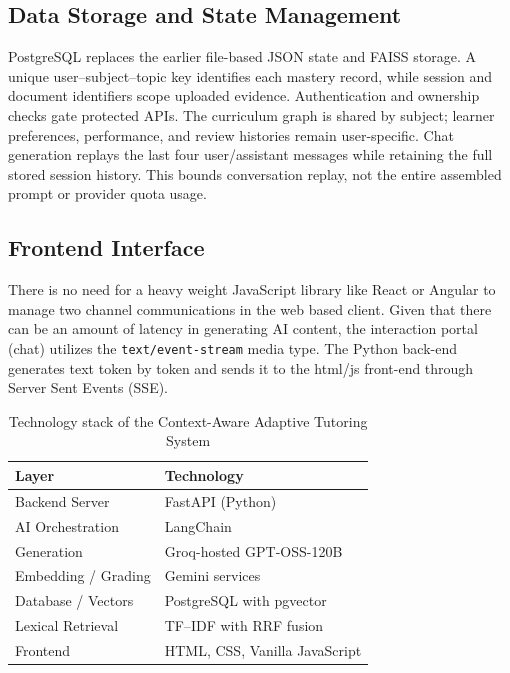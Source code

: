 \documentclass[11pt, a4paper, oneside]{report}
\begin{document}
\subsection{Data Storage and State Management}
PostgreSQL replaces the earlier file-based JSON state and FAISS storage. A unique user--subject--topic key identifies each mastery record, while session and document identifiers scope uploaded evidence. Authentication and ownership checks gate protected APIs. The curriculum graph is shared by subject; learner preferences, performance, and review histories remain user-specific. Chat generation replays the last four user/assistant messages while retaining the full stored session history. This bounds conversation replay, not the entire assembled prompt or provider quota usage.

\subsection{Frontend Interface}
There is no need for a heavy weight JavaScript library like React or Angular to manage two
channel communications in the web based client. Given that there can be an amount of
latency in generating AI content, the interaction portal (chat) utilizes the
\texttt{text/event-stream} media type. The Python back-end generates text token by token
and sends it to the html/js front-end through Server Sent Events (SSE).

\begin{table}[H]
  \centering
  \caption{Technology stack of the Context-Aware Adaptive Tutoring System}
  \label{tab:tech_stack}
  \begin{tabular}{@{}ll@{}}
    \toprule
    \textbf{Layer} & \textbf{Technology} \\
    \midrule
    Backend Server      & FastAPI (Python) \\
    AI Orchestration    & LangChain \\
    Generation          & Groq-hosted GPT-OSS-120B \\
    Embedding / Grading & Gemini services \\
    Database / Vectors  & PostgreSQL with pgvector \\
    Lexical Retrieval   & TF--IDF with RRF fusion \\
    Frontend            & HTML, CSS, Vanilla JavaScript \\
    \bottomrule
  \end{tabular}
\end{table}
\end{document}
